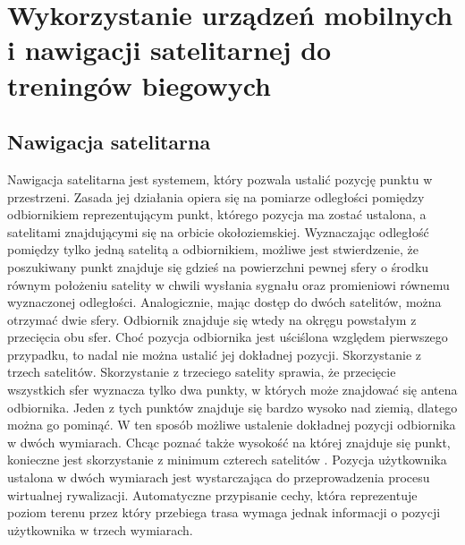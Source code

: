 \chapter{Wykorzystanie urządzeń mobilnych i nawigacji satelitarnej do treningów biegowych}\label{chap:wykorzystanie_urzadzen_mobilnych}
\section{Nawigacja satelitarna}\label{section:nawigacja-satelitarna}
Nawigacja satelitarna jest systemem, który pozwala ustalić pozycję punktu w przestrzeni. Zasada jej działania opiera się na pomiarze odległości pomiędzy odbiornikiem reprezentującym punkt, którego pozycja ma zostać ustalona, a satelitami znajdującymi się na orbicie okołoziemskiej. Wyznaczając odległość pomiędzy tylko jedną satelitą a odbiornikiem, możliwe jest stwierdzenie, że poszukiwany punkt znajduje się gdzieś na powierzchni pewnej sfery o środku równym położeniu satelity w chwili wysłania sygnału oraz promieniowi równemu wyznaczonej odległości. Analogicznie, mając dostęp do dwóch satelitów, można otrzymać dwie sfery. Odbiornik znajduje się wtedy na okręgu powstałym z przecięcia obu sfer. Choć pozycja odbiornika jest uściślona względem pierwszego przypadku, to nadal nie można ustalić jej dokładnej pozycji. Skorzystanie z trzech satelitów. Skorzystanie z trzeciego satelity sprawia, że przecięcie wszystkich sfer wyznacza tylko dwa punkty, w których może znajdować się antena odbiornika. Jeden z tych punktów znajduje się bardzo wysoko nad ziemią, dlatego można go pominąć. W ten sposób możliwe ustalenie dokładnej pozycji odbiornika w dwóch wymiarach. Chcąc poznać także wysokość na której znajduje się punkt, konieczne jest skorzystanie z minimum czterech satelitów  \cite{gps2}. Pozycja użytkownika ustalona w dwóch wymiarach jest wystarczająca do przeprowadzenia procesu wirtualnej rywalizacji. Automatyczne przypisanie cechy, która reprezentuje poziom terenu przez który przebiega trasa wymaga jednak informacji o pozycji użytkownika w trzech wymiarach.


